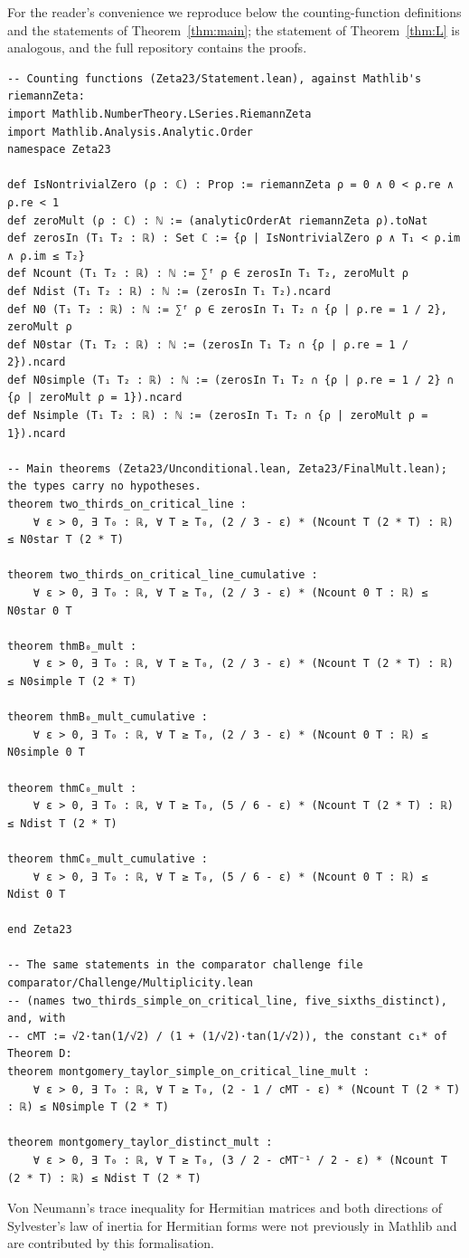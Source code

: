 \documentclass[11pt]{amsart}
\theoremstyle{definition}
\theoremstyle{remark}
\numberwithin{equation}{section}
\begin{document}
For the reader's convenience we reproduce below the counting-function definitions and the statements of Theorem~\ref{thm:main}; the statement of Theorem~\ref{thm:L} is analogous, and the full repository contains the proofs.
\begin{lstlisting}
-- Counting functions (Zeta23/Statement.lean), against Mathlib's riemannZeta:
import Mathlib.NumberTheory.LSeries.RiemannZeta
import Mathlib.Analysis.Analytic.Order
namespace Zeta23

def IsNontrivialZero (ρ : ℂ) : Prop := riemannZeta ρ = 0 ∧ 0 < ρ.re ∧ ρ.re < 1
def zeroMult (ρ : ℂ) : ℕ := (analyticOrderAt riemannZeta ρ).toNat
def zerosIn (T₁ T₂ : ℝ) : Set ℂ := {ρ | IsNontrivialZero ρ ∧ T₁ < ρ.im ∧ ρ.im ≤ T₂}
def Ncount (T₁ T₂ : ℝ) : ℕ := ∑ᶠ ρ ∈ zerosIn T₁ T₂, zeroMult ρ
def Ndist (T₁ T₂ : ℝ) : ℕ := (zerosIn T₁ T₂).ncard
def N0 (T₁ T₂ : ℝ) : ℕ := ∑ᶠ ρ ∈ zerosIn T₁ T₂ ∩ {ρ | ρ.re = 1 / 2}, zeroMult ρ
def N0star (T₁ T₂ : ℝ) : ℕ := (zerosIn T₁ T₂ ∩ {ρ | ρ.re = 1 / 2}).ncard
def N0simple (T₁ T₂ : ℝ) : ℕ := (zerosIn T₁ T₂ ∩ {ρ | ρ.re = 1 / 2} ∩ {ρ | zeroMult ρ = 1}).ncard
def Nsimple (T₁ T₂ : ℝ) : ℕ := (zerosIn T₁ T₂ ∩ {ρ | zeroMult ρ = 1}).ncard

-- Main theorems (Zeta23/Unconditional.lean, Zeta23/FinalMult.lean); the types carry no hypotheses.
theorem two_thirds_on_critical_line :
    ∀ ε > 0, ∃ T₀ : ℝ, ∀ T ≥ T₀, (2 / 3 - ε) * (Ncount T (2 * T) : ℝ) ≤ N0star T (2 * T)

theorem two_thirds_on_critical_line_cumulative :
    ∀ ε > 0, ∃ T₀ : ℝ, ∀ T ≥ T₀, (2 / 3 - ε) * (Ncount 0 T : ℝ) ≤ N0star 0 T

theorem thmB₀_mult :
    ∀ ε > 0, ∃ T₀ : ℝ, ∀ T ≥ T₀, (2 / 3 - ε) * (Ncount T (2 * T) : ℝ) ≤ N0simple T (2 * T)

theorem thmB₀_mult_cumulative :
    ∀ ε > 0, ∃ T₀ : ℝ, ∀ T ≥ T₀, (2 / 3 - ε) * (Ncount 0 T : ℝ) ≤ N0simple 0 T

theorem thmC₀_mult :
    ∀ ε > 0, ∃ T₀ : ℝ, ∀ T ≥ T₀, (5 / 6 - ε) * (Ncount T (2 * T) : ℝ) ≤ Ndist T (2 * T)

theorem thmC₀_mult_cumulative :
    ∀ ε > 0, ∃ T₀ : ℝ, ∀ T ≥ T₀, (5 / 6 - ε) * (Ncount 0 T : ℝ) ≤ Ndist 0 T

end Zeta23

-- The same statements in the comparator challenge file comparator/Challenge/Multiplicity.lean
-- (names two_thirds_simple_on_critical_line, five_sixths_distinct), and, with
-- cMT := √2·tan(1/√2) / (1 + (1/√2)·tan(1/√2)), the constant c₁* of Theorem D:
theorem montgomery_taylor_simple_on_critical_line_mult :
    ∀ ε > 0, ∃ T₀ : ℝ, ∀ T ≥ T₀, (2 - 1 / cMT - ε) * (Ncount T (2 * T) : ℝ) ≤ N0simple T (2 * T)

theorem montgomery_taylor_distinct_mult :
    ∀ ε > 0, ∃ T₀ : ℝ, ∀ T ≥ T₀, (3 / 2 - cMT⁻¹ / 2 - ε) * (Ncount T (2 * T) : ℝ) ≤ Ndist T (2 * T)
\end{lstlisting}
Von Neumann's trace inequality for Hermitian matrices and both directions of Sylvester's law of inertia for Hermitian forms were not previously in Mathlib and are contributed by this formalisation.
\end{document}
